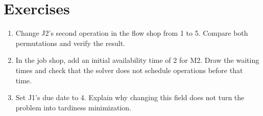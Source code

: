 \section{Exercises}
\begin{enumerate}
\item Change J2's second operation in the flow shop from 1 to 5.
      Compare both permutations and verify the result.
\item In the job shop, add an initial availability time of 2 for M2.
      Draw the waiting times and check that the solver does not schedule
      operations before that time.
\item Set J1's due date to 4. Explain why changing this field
      does not turn the problem into tardiness minimization.
\end{enumerate}
